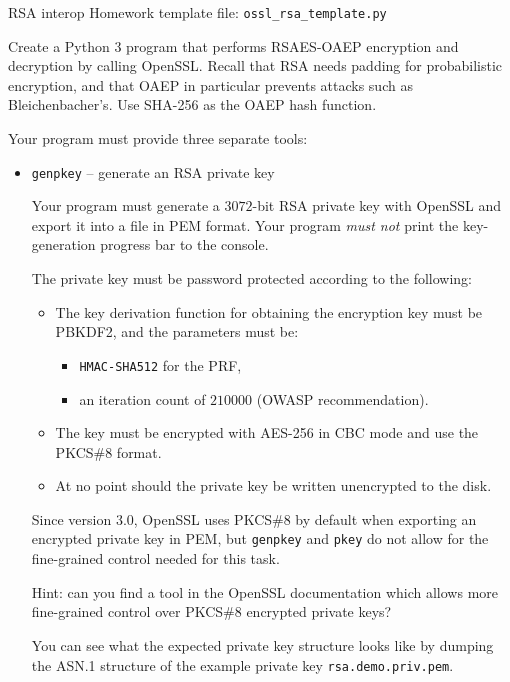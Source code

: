 \documentclass{homework}
\begin{document}
\begin{task}{RSA interop}
  Homework template file: \texttt{ossl\_rsa\_template.py}

  Create a Python 3 program that performs RSAES-OAEP encryption and decryption by calling OpenSSL.
  Recall that RSA needs padding for probabilistic encryption, and that OAEP in particular prevents attacks such as Bleichenbacher's.
  Use SHA-256 as the OAEP hash function.

  Your program must provide three separate tools:
  \begin{itemize}
    \item \texttt{genpkey} -- generate an RSA private key

    Your program must generate a $3072$-bit RSA private key with OpenSSL and export it into a file in PEM format.
    Your program \emph{must not} print the key-generation progress bar to the console.

    The private key must be password protected according to the following:
    \begin{itemize}
      \item The key derivation function for obtaining the encryption key must be PBKDF2, and the parameters must be:
      \begin{itemize}
        \item \texttt{HMAC-SHA512} for the PRF,
        \item an iteration count of $210000$ (OWASP recommendation).
      \end{itemize}
      \item The key must be encrypted with AES-256 in CBC mode and use the PKCS\#8 format.
      \item At no point should the private key be written unencrypted to the disk.
    \end{itemize}

    \begin{tcolorbox}[title=Note]
      Since version 3.0, OpenSSL uses PKCS\#8 by default when exporting an encrypted private key in PEM, but \texttt{genpkey} and \texttt{pkey} do not allow for the fine-grained control needed for this task.

      Hint: can you find a tool in the OpenSSL documentation which allows more fine-grained control over PKCS\#8 encrypted private keys?
    \end{tcolorbox}

    You can see what the expected private key structure looks like by dumping the ASN.1 structure of the example private key \texttt{rsa.demo.priv.pem}.


\end{itemize}
\end{task}
\end{document}
